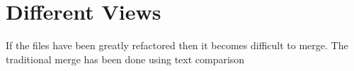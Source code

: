 
\chapter{Different Views}
If the files have been greatly refactored then it becomes difficult to merge.  The traditional merge has been done using text comparison
